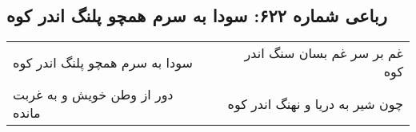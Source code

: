 \begin{center}
\section*{رباعی شماره ۶۲۲: سودا به سرم همچو پلنگ اندر کوه}
\label{sec:sh622}
\begin{longtable}{l p{0.5cm} r}
سودا به سرم همچو پلنگ اندر کوه
&&
غم بر سر غم بسان سنگ اندر کوه
\\
دور از وطن خویش و به غربت مانده
&&
چون شیر به دریا و نهنگ اندر کوه
\\
\end{longtable}
\end{center}
